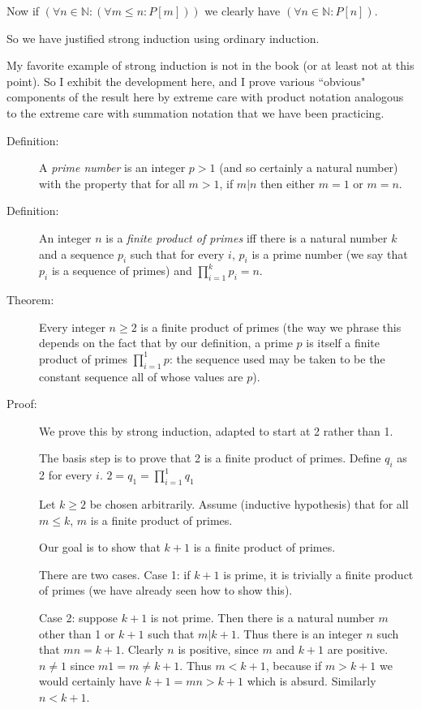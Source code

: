 \documentclass[12pt]{article}
\begin{document}
Now if $(\forall n \in \mathbb N:(\forall m \leq n:P[m]))$ we clearly have $(\forall n \in \mathbb N:P[n])$.

So we have justified strong induction using ordinary induction.

My favorite example of strong induction is not in the book (or at least not at this point).  So I exhibit the development here, and I prove various ``obvious" components of the result here by extreme care with product notation analogous to the extreme care with summation notation that we have been practicing.

\begin{description}

\item[Definition:]  A {\em prime number\/} is an integer $p>1$ (and so certainly a natural number) with the property
that for all $m>1$,  if $m|n$ then either $m=1$ or $m=n$.

\item[Definition:]  An integer $n$ is a {\em finite product of primes\/} iff there is a natural number $k$ and a sequence $p_i$ such that for every $i$, $p_i$ is a prime number (we say that $p_i$ is a sequence of primes) and $\prod_{i=1}^k p_i = n$.

\item[Theorem:]  Every integer $n \geq 2$ is a finite product of primes (the way we phrase this depends on the fact that by our definition, a prime $p$ is itself a finite product of primes $\prod_{i=1}^1 p$:  the sequence used may be taken to be the constant sequence all of whose values are $p$).

\item[Proof:]  We prove this by strong induction, adapted to start at 2 rather than 1.

The basis step is to prove that 2 is a finite product of primes.  Define $q_i$ as 2 for every $i$.  $2 = q_1 = \prod_{i=1}^1 q_1$

Let $k \geq 2$ be chosen arbitrarily.  Assume (inductive hypothesis) that for all $m \leq k$, $m$ is a finite product of primes.

Our goal is to show that $k+1$ is a finite product of primes.

There are two cases.  Case 1:  if $k+1$ is prime, it is trivially a finite product of primes (we have already seen how to show this).

Case 2:  suppose $k+1$ is not prime.  Then there is a natural number $m$ other than 1 or $k+1$ such that $m|k+1$.
Thus there is an integer $n$ such that $mn=k+1$.  Clearly $n$ is positive, since $m$ and $k+1$ are positive.
$n \neq 1$ since $m1 = m \neq k+1$.  Thus $m<k+1$, because if $m>k+1$ we would certainly have $k+1 = mn >k+1$ which is absurd.  Similarly $n<k+1$.


\end{description}
\end{document}

